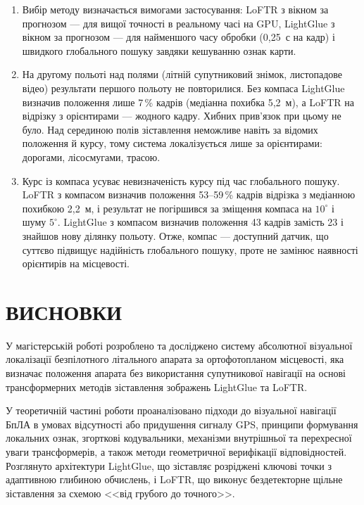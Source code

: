 \documentclass[a4paper, 12pt, titlepage]{article}
\begin{document}
\begin{enumerate}
    \item Вибір методу визначається вимогами застосування: LoFTR з вікном за прогнозом --- для вищої точності в реальному часі на GPU, LightGlue з вікном за прогнозом --- для найменшого часу обробки (0,25~с на кадр) і швидкого глобального пошуку завдяки кешуванню ознак карти.
    \item На другому польоті над полями (літній супутниковий знімок, листопадове відео) результати першого польоту не повторилися. Без компаса LightGlue визначив положення лише 7\,\% кадрів (медіанна похибка 5,2~м), а LoFTR на відрізку з орієнтирами --- жодного кадру. Хибних прив'язок при цьому не було. Над серединою полів зіставлення неможливе навіть за відомих положення й курсу, тому система локалізується лише за орієнтирами: дорогами, лісосмугами, трасою.
    \item Курс із компаса усуває невизначеність курсу під час глобального пошуку. LoFTR з компасом визначив положення 53--59\,\% кадрів відрізка з медіанною похибкою 2,2~м, і результат не погіршився за зміщення компаса на $10^\circ$ і шуму $5^\circ$. LightGlue з компасом визначив положення 43 кадрів замість 23 і знайшов нову ділянку польоту. Отже, компас --- доступний датчик, що суттєво підвищує надійність глобального пошуку, проте не замінює наявності орієнтирів на місцевості.
\end{enumerate}




\newpage
\section*{\centering ВИСНОВКИ}

У магістерській роботі розроблено та досліджено систему абсолютної візуальної локалізації безпілотного літального апарата за ортофотопланом місцевості, яка визначає положення апарата без використання супутникової навігації на основі трансформерних методів зіставлення зображень LightGlue та LoFTR.

У теоретичній частині роботи проаналізовано підходи до візуальної навігації БпЛА в умовах відсутності або придушення сигналу GPS, принципи формування локальних ознак, згорткові кодувальники, механізми внутрішньої та перехресної уваги трансформерів, а також методи геометричної верифікації відповідностей. Розглянуто архітектури LightGlue, що зіставляє розріджені ключові точки з адаптивною глибиною обчислень, і LoFTR, що виконує бездетекторне щільне зіставлення за схемою <<від грубого до точного>>.
\end{document}
